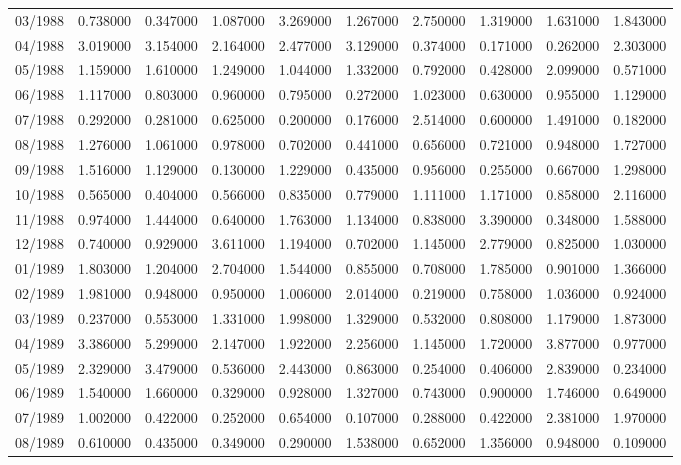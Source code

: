 \begin{tabular}{lrrrrrrrrr}
03/1988 & 0.738000 & 0.347000 & 1.087000 & 3.269000 & 1.267000 & 2.750000 & 1.319000 & 1.631000 & 1.843000 \\
04/1988 & 3.019000 & 3.154000 & 2.164000 & 2.477000 & 3.129000 & 0.374000 & 0.171000 & 0.262000 & 2.303000 \\
05/1988 & 1.159000 & 1.610000 & 1.249000 & 1.044000 & 1.332000 & 0.792000 & 0.428000 & 2.099000 & 0.571000 \\
06/1988 & 1.117000 & 0.803000 & 0.960000 & 0.795000 & 0.272000 & 1.023000 & 0.630000 & 0.955000 & 1.129000 \\
07/1988 & 0.292000 & 0.281000 & 0.625000 & 0.200000 & 0.176000 & 2.514000 & 0.600000 & 1.491000 & 0.182000 \\
08/1988 & 1.276000 & 1.061000 & 0.978000 & 0.702000 & 0.441000 & 0.656000 & 0.721000 & 0.948000 & 1.727000 \\
09/1988 & 1.516000 & 1.129000 & 0.130000 & 1.229000 & 0.435000 & 0.956000 & 0.255000 & 0.667000 & 1.298000 \\
10/1988 & 0.565000 & 0.404000 & 0.566000 & 0.835000 & 0.779000 & 1.111000 & 1.171000 & 0.858000 & 2.116000 \\
11/1988 & 0.974000 & 1.444000 & 0.640000 & 1.763000 & 1.134000 & 0.838000 & 3.390000 & 0.348000 & 1.588000 \\
12/1988 & 0.740000 & 0.929000 & 3.611000 & 1.194000 & 0.702000 & 1.145000 & 2.779000 & 0.825000 & 1.030000 \\
01/1989 & 1.803000 & 1.204000 & 2.704000 & 1.544000 & 0.855000 & 0.708000 & 1.785000 & 0.901000 & 1.366000 \\
02/1989 & 1.981000 & 0.948000 & 0.950000 & 1.006000 & 2.014000 & 0.219000 & 0.758000 & 1.036000 & 0.924000 \\
03/1989 & 0.237000 & 0.553000 & 1.331000 & 1.998000 & 1.329000 & 0.532000 & 0.808000 & 1.179000 & 1.873000 \\
04/1989 & 3.386000 & 5.299000 & 2.147000 & 1.922000 & 2.256000 & 1.145000 & 1.720000 & 3.877000 & 0.977000 \\
05/1989 & 2.329000 & 3.479000 & 0.536000 & 2.443000 & 0.863000 & 0.254000 & 0.406000 & 2.839000 & 0.234000 \\
06/1989 & 1.540000 & 1.660000 & 0.329000 & 0.928000 & 1.327000 & 0.743000 & 0.900000 & 1.746000 & 0.649000 \\
07/1989 & 1.002000 & 0.422000 & 0.252000 & 0.654000 & 0.107000 & 0.288000 & 0.422000 & 2.381000 & 1.970000 \\
08/1989 & 0.610000 & 0.435000 & 0.349000 & 0.290000 & 1.538000 & 0.652000 & 1.356000 & 0.948000 & 0.109000 \\

\end{tabular}
